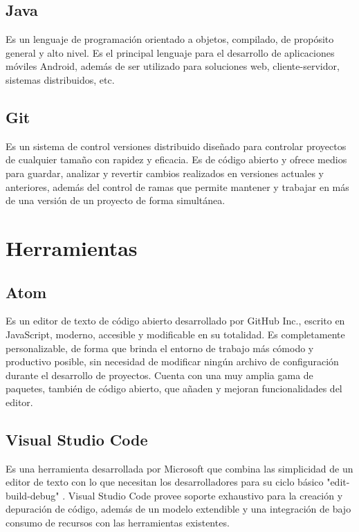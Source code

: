 \documentclass{article}
\begin{document}
    \subsection{Java}
        Es un lenguaje de programación orientado a objetos, compilado, de propósito general y alto nivel. Es el principal lenguaje para el desarrollo de aplicaciones móviles Android, además de ser utilizado para soluciones web, cliente-servidor, sistemas distribuidos, etc.

    \subsection{Git}
        Es un sistema de control versiones distribuido diseñado para controlar proyectos de cualquier tamaño con rapidez y eficacia. Es de código abierto y ofrece medios para guardar, analizar y revertir cambios realizados en versiones actuales y anteriores, además del control de ramas que permite mantener y trabajar en más de una versión de un proyecto de forma simultánea.

\section{Herramientas} 

    \subsection{Atom}
        Es un editor de texto de código abierto desarrollado por GitHub Inc., escrito en JavaScript, moderno, accesible y modificable en su totalidad. Es completamente personalizable, de forma que brinda el entorno de trabajo más cómodo y productivo posible, sin necesidad de modificar ningún archivo de configuración durante el desarrollo de proyectos. Cuenta con una muy amplia gama de paquetes, también de código abierto, que añaden y mejoran funcionalidades del editor.

    \subsection{Visual Studio Code}
        Es una herramienta desarrollada por Microsoft que combina las simplicidad de un editor de texto con lo que necesitan los desarrolladores para su ciclo básico "edit-build-debug" . Visual Studio Code provee soporte exhaustivo para la creación y depuración de código, además de un modelo extendible y una integración de bajo consumo de recursos con las herramientas existentes.
\end{document}
